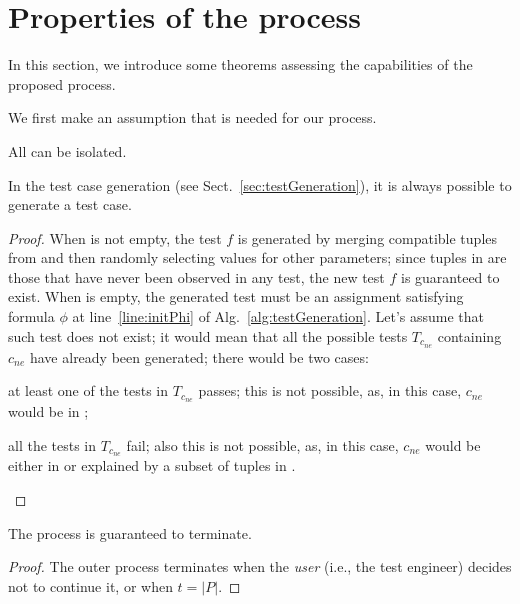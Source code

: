 \begin{tikzborder}{\cite{Gargantini16:validation}}
\begin{tikzborder}{\cite{gargantini_combinatorial_2017}}
\begin{tikzborder}{\cite{gargantini_combinatorial_2017}}
\begin{tikzborder}{\cite{garn2019}}
\begin{tikzborder}{\cite{arcaini2019achieving}}
\section{Properties of the \mix process}\label{sec:theorems}

\begin{tikzborder}{}	
In this section, we introduce some theorems assessing the capabilities of the proposed process.

We first make an assumption that is needed for our process.

\begin{assumption}\label{assu:oneTestEts}
	All \truemfics can be isolated.
\end{assumption}

\begin{thm}\label{thm:testGen}
	In the test case generation (see Sect.~\ref{sec:testGeneration}), it is always possible to generate a test case.
\end{thm}

\begin{proof}
	When \ut is not empty, the test $f$ is generated by merging compatible tuples from \ut and then randomly selecting values for other parameters; since tuples in \ut are those that have never been observed in any test, the new test $f$ is guaranteed to exist. When \ut is empty, the generated test must be an assignment satisfying formula $\phi$ at line~\ref{line:initPhi} of Alg.~\ref{alg:testGeneration}. Let's assume that such test does not exist; it would mean that all the possible tests $T_{c_{\mathit{ne}}}$ containing $c_{\mathit{ne}}$ have already been generated; there would be two cases:
	\begin{compactitem}
		\item at least one of the tests in $T_{c_{\mathit{ne}}}$ passes; this is not possible, as, in this case, $c_{\mathit{ne}}$ would be in \pt;
		\item all the tests in $T_{c_{\mathit{ne}}}$ fail; also this is not possible, as, in this case, $c_{\mathit{ne}}$ would be either in \isoMficsSet or explained by a subset of tuples in \isoMficsSet.
	\end{compactitem}
\end{proof}

\begin{thm}[Termination]\label{thm:termination}
	The process is guaranteed to terminate.
\end{thm}

\begin{proof}
	The outer process \mix terminates when the \textit{user} (i.e., the test engineer) decides not to continue it, or when $t=\vert P \vert$.
	

\end{proof}
\end{tikzborder}
\end{tikzborder}
\end{tikzborder}
\end{tikzborder}
\end{tikzborder}
\end{tikzborder}
